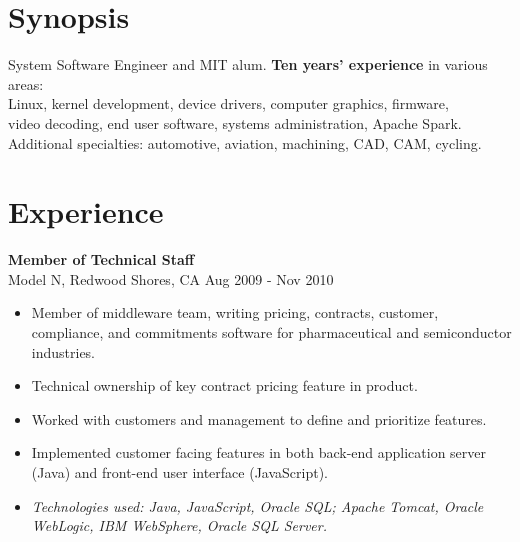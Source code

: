 \documentclass[line,margin]{res}
\begin{document}
\thispagestyle{empty}

\address{1201 West Park Street, Cedar Park, TX 78613-2801}
\address{ \href{mailto:jsoltren@alum.mit.edu}{jsoltren@alum.mit.edu}
   +1 (347) 503-9558
   \url{https://www.linkedin.com/in/jsoltren}}

\begin{resume}

\section{Synopsis}
System Software Engineer and MIT alum. \textbf{Ten years’ experience}
in various areas:\\
Linux, kernel development, device drivers, computer graphics, firmware,\\
video decoding, end user software, systems administration, Apache Spark.\\
Additional specialties: automotive, aviation, machining, CAD, CAM, cycling.



\section{Experience}



%

\textbf{Member of Technical Staff} \\
Model N, Redwood Shores, CA \hfill Aug 2009 - Nov 2010
\begin{itemize}  \itemsep -2pt %
\item Member of middleware team, writing pricing, contracts, customer,
      compliance, and commitments software for pharmaceutical and
      semiconductor industries.
\item Technical ownership of key contract pricing feature in product.
\item Worked with customers and management to define and prioritize features.
\item Implemented customer facing features in both back-end application server
      (Java) and front-end user interface (JavaScript).
\item \textit{Technologies used: Java, JavaScript, Oracle SQL; Apache Tomcat,
              Oracle\\\mbox{WebLogic}, IBM WebSphere, Oracle SQL Server.}
\end{itemize}


\end{resume}
\end{document}

